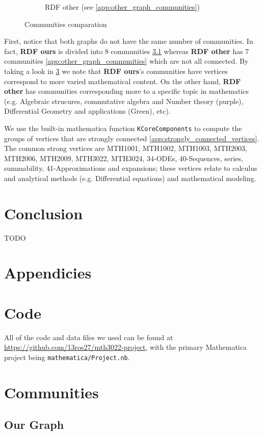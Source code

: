 \documentclass[english, 12pt]{article}
\begin{document}
\begin{figure}[H]
\begin{subfigure}[b]{0.45\textwidth}
        \caption{RDF other (see \ref{app:other_graph_communities})}
    \end{subfigure}
    \caption{Communities comparation}
    \label{fig:communities_comp}
\end{figure}


First, notice that both graphs do not have the same number of communities. In fact, {\bf RDF ours} is divided into 8 communities \ref{app:our_graph_communities} whereas {\bf RDF other} has 7 communities \ref{app:other_graph_communities} which are not all connected. By taking a look in \ref{app:communities_comp} we note that {\bf RDF ours}'s communities have vertices correspond to more varied mathematical content. On the other hand, {\bf RDF other} has communities corresponding more to a specific topic in mathematics (e.g. Algebraic strucures, commutative algebra and Number theory (purple), Differential Geometry and applications (Green), etc).   

We use the built-in mathematica function \texttt{KCoreComponents} to compute the groups of vertices that are strongly connected \ref{app:strongly_connected_vertices}. The common strong vertices are MTH1001, MTH1002, MTH1003, MTH2003, MTH2006, MTH2009, MTH3022, MTH3024, 34-ODEs, 40-Sequences, series, summability, 41-Approximations and expansions; these vertices relate to calculus and analytical methods (e.g. Differential equations) and mathematical modeling.

\section{Conclusion}
TODO


\printbibliography

\section*{Appendicies}
\parskip=0.0pt
\appendix
\section{Code}
All of the code and data files we used can be found at \url{https://github.com/13ros27/mth3022-project}, with the primary Mathematica project being \texttt{mathematica/Project.nb}.

\section{Communities}\label{app:communities_comp}
\subsection{Our Graph} \label{app:our_graph_communities}
\end{document}
